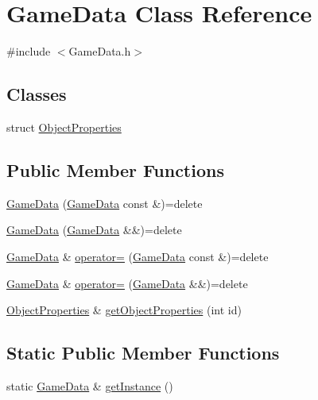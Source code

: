 \hypertarget{class_game_data}{}\section{Game\+Data Class Reference}
\label{class_game_data}


{\ttfamily \#include $<$Game\+Data.\+h$>$}

\subsection*{Classes}
\begin{DoxyCompactItemize}
\item 
struct \hyperlink{struct_game_data_1_1_object_properties}{Object\+Properties}
\end{DoxyCompactItemize}
\subsection*{Public Member Functions}
\begin{DoxyCompactItemize}
\item 
\hyperlink{class_game_data_a0361292205caafffd2810013c2fef134}{Game\+Data} (\hyperlink{class_game_data}{Game\+Data} const \&)=delete
\item 
\hyperlink{class_game_data_af4225d69d56095e6d1a6d3bdeba8602f}{Game\+Data} (\hyperlink{class_game_data}{Game\+Data} \&\&)=delete
\item 
\hyperlink{class_game_data}{Game\+Data} \& \hyperlink{class_game_data_af68a0e80d4eaf087f85c41731aec3713}{operator=} (\hyperlink{class_game_data}{Game\+Data} const \&)=delete
\item 
\hyperlink{class_game_data}{Game\+Data} \& \hyperlink{class_game_data_a7727619253e644dde96794e47ff9ff27}{operator=} (\hyperlink{class_game_data}{Game\+Data} \&\&)=delete
\item 
\hyperlink{struct_game_data_1_1_object_properties}{Object\+Properties} \& \hyperlink{class_game_data_acf4e9f7e0bbd359c54d048ccdbbdcd2b}{get\+Object\+Properties} (int id)
\end{DoxyCompactItemize}
\subsection*{Static Public Member Functions}
\begin{DoxyCompactItemize}
\item 
static \hyperlink{class_game_data}{Game\+Data} \& \hyperlink{class_game_data_a5930d5371cde0a43f4fa05b6b7152bb8}{get\+Instance} ()
\end{DoxyCompactItemize}
